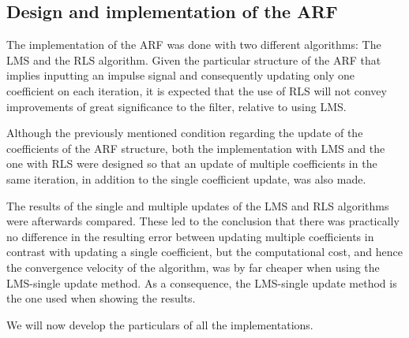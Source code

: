 \documentclass[conference]{IEEEtran}
\begin{document}
\subsection{Design and implementation of the ARF}

The implementation of the ARF was done with two different algorithms: The LMS and the RLS algorithm.
Given the particular structure of the ARF that implies inputting an impulse signal and consequently updating only one coefficient on each iteration, it is expected that the use of RLS will not convey improvements of great significance to the filter, relative to using LMS. \par 
Although the previously mentioned condition regarding the update of the coefficients of the ARF structure, both the implementation with LMS and the one with RLS were designed so that an update of multiple coefficients in the same iteration, in addition to the single coefficient update, was also made. \par
The results of the single and multiple updates of the LMS and RLS algorithms were afterwards compared. These led to the conclusion that there was practically no difference in the resulting error between updating multiple coefficients in contrast with updating a single coefficient, but the computational cost, and hence the convergence velocity of the algorithm, was by far cheaper when using the LMS-single update method. As a consequence, the LMS-single update method is the one used when showing the results.\par
We will now develop the particulars of all the implementations.
\end{document}
